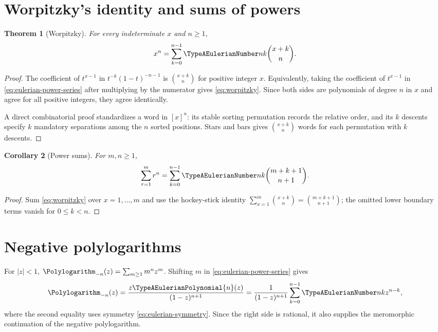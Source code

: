 \documentclass[11pt,a4paper,oneside,openany]{book}
\newtheorem{theorem}{Theorem}[chapter]
\newtheorem{corollary}[theorem]{Corollary}
\theoremstyle{definition}
\theoremstyle{remark}
\begin{document}
\section{Worpitzky's identity and sums of powers}
\begin{theorem}[Worpitzky]\label{thm:worpitzky}
For every indeterminate $x$ and $n\ge1$,
\begin{equation}\label{eq:worpitzky}
 x^n=\sum_{k=0}^{n-1}\TypeAEulerianNumber nk\binom{x+k}{n}.
\end{equation}
\end{theorem}
\begin{proof}
The coefficient of $t^{x-1}$ in
$t^{-k}(1-t)^{-n-1}$ is $\binom{x+k}{n}$ for positive integer $x$.
Equivalently, taking the coefficient of $t^{x-1}$ in
\eqref{eq:eulerian-power-series} after multiplying by the numerator gives
\eqref{eq:worpitzky}.  Since both sides are polynomials of degree $n$ in $x$ and
agree for all positive integers, they agree identically.

A direct combinatorial proof standardizes a word in $[x]^n$: its stable sorting
permutation records the relative order, and its $k$ descents specify $k$ mandatory
separations among the $n$ sorted positions.  Stars and bars gives
$\binom{x+k}{n}$ words for each permutation with $k$ descents.
\end{proof}

\begin{corollary}[Power sums]\label{cor:eulerian-power-sum}
For $m,n\ge1$,
\begin{equation}\label{eq:eulerian-power-sum}
 \sum_{r=1}^{m}r^n
 =\sum_{k=0}^{n-1}\TypeAEulerianNumber nk\binom{m+k+1}{n+1}.
\end{equation}
\end{corollary}
\begin{proof}
Sum \eqref{eq:worpitzky} over $x=1,\ldots,m$ and use the hockey-stick identity
$\sum_{x=1}^{m}\binom{x+k}{n}=\binom{m+k+1}{n+1}$; the omitted lower boundary
terms vanish for $0\le k<n$.
\end{proof}

\section{Negative polylogarithms}
For $|z|<1$, $\Polylogarithm_{-n}(z)=\sum_{m\ge1}m^nz^m$.  Shifting $m$ in
\eqref{eq:eulerian-power-series} gives
\begin{equation}\label{eq:negative-polylog-eulerian}
 \Polylogarithm_{-n}(z)=\frac{z\TypeAEulerianPolynomial{n}(z)}{(1-z)^{n+1}}
 =\frac{1}{(1-z)^{n+1}}
   \sum_{k=0}^{n-1}\TypeAEulerianNumber nk z^{n-k},
\end{equation}
where the second equality uses symmetry \eqref{eq:eulerian-symmetry}.  Since the
right side is rational, it also supplies the meromorphic continuation of the
negative polylogarithm.
\end{document}
